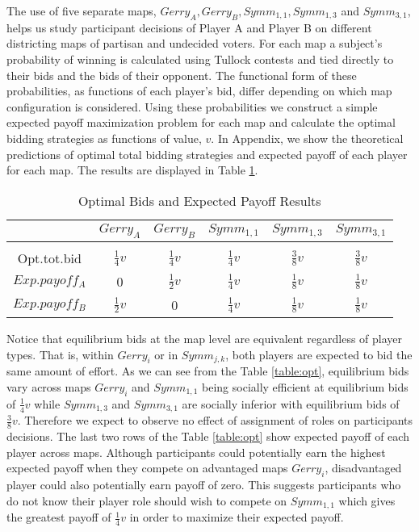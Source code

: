 \documentclass[AER]{AEA}
\begin{document}
The use of five separate maps, $Gerry_A, Gerry_B, Symm_{1,1}, Symm_{1,3}$ and $Symm_{3,1}$, helps us study participant decisions of Player A and Player B on different districting maps of partisan and undecided voters. For each map a subject's probability of winning is calculated using Tullock contests and tied directly to their bids and the bids of their opponent. The functional form of these probabilities, as functions of each player's bid, differ depending on which map configuration is considered. Using these probabilities we construct a simple expected payoff maximization problem for each map and calculate the optimal bidding strategies as functions of value, $v$. In Appendix, we show the theoretical predictions of optimal total bidding strategies and expected payoff of each player for each map. The results are displayed in Table \ref{Tab:theory_predictions}.
\begin{table}[ht]
\caption{Optimal Bids and Expected Payoff Results} %
\centering %
\begin{tabular}{c c c c c c} %
\hline\hline %
 & $Gerry_A$ & $Gerry_B$ & $Symm_{1,1}$ & $Symm_{1,3}$ & $Symm_{3,1}$ \\ [0.5ex] %
\hline \\[-1.8ex]
\vspace{0.2cm}
Opt.tot.bid & $\frac{1}{4}v$ & $\frac{1}{4}v$ & $\frac{1}{4}v$ & $\frac{3}{8}v$ & $\frac{3}{8}v$ \\ %
\vspace{0.2cm}
$Exp.payoff_A$ & 0 & $\frac{1}{2}v$ & $\frac{1}{4}v$ & $\frac{1}{8}v$ & $\frac{1}{8}v$ \\
$Exp.payoff_B$ & $\frac{1}{2}v$ & 0 & $\frac{1}{4}v$ & $\frac{1}{8}v$ & $\frac{1}{8}v$ \\ [1ex] %
\hline %
\end{tabular}
\label{Tab:theory_predictions} %
\end{table}
Notice that equilibrium bids at the map level are equivalent regardless of player types. That is, within $Gerry_i$ or in $Symm_{j,k}$, both players are expected to bid the same amount of effort. As we can see from the Table \ref{table:opt}, equilibrium bids vary across maps $Gerry_i$ and $Symm_{1,1}$ being socially efficient at equilibrium bids of $\frac{1}{4}v$ while $Symm_{1,3}$ and $Symm_{3,1}$ are socially inferior with equilibrium bids of $\frac{3}{8}v$. Therefore we expect to observe no effect of assignment of roles on participants decisions. The last two rows of the Table \ref{table:opt} show expected payoff of each player across maps. Although participants could potentially earn the highest expected payoff when they compete on advantaged maps $Gerry_i$, disadvantaged player could also potentially earn payoff of zero. This suggests participants who do not know their player role should wish to compete on $Symm_{1,1}$ which gives the greatest payoff of $\frac{1}{4}v$ in order to maximize their expected payoff.
\end{document}

